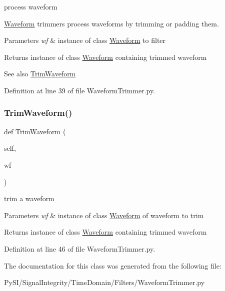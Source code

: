 process waveform 

\hyperlink{namespaceSignalIntegrity_1_1TimeDomain_1_1Waveform}{Waveform} trimmers process waveforms by trimming or padding them.


\begin{DoxyParams}{Parameters}
{\em wf} & instance of class \hyperlink{namespaceSignalIntegrity_1_1TimeDomain_1_1Waveform}{Waveform} to filter \\
\hline
\end{DoxyParams}
\begin{DoxyReturn}{Returns}
instance of class \hyperlink{namespaceSignalIntegrity_1_1TimeDomain_1_1Waveform}{Waveform} containing trimmed waveform 
\end{DoxyReturn}
\begin{DoxySeeAlso}{See also}
\hyperlink{classSignalIntegrity_1_1TimeDomain_1_1Filters_1_1WaveformTrimmer_1_1WaveformTrimmer_aba4602fa45a1eaabd2eb64f1866def53}{Trim\+Waveform} 
\end{DoxySeeAlso}


Definition at line 39 of file Waveform\+Trimmer.\+py.

\mbox{\label{classSignalIntegrity_1_1TimeDomain_1_1Filters_1_1WaveformTrimmer_1_1WaveformTrimmer_aba4602fa45a1eaabd2eb64f1866def53}} 
\subsubsection{\texorpdfstring{Trim\+Waveform()}{TrimWaveform()}}
{\footnotesize\ttfamily def Trim\+Waveform (\begin{DoxyParamCaption}\item[{}]{self,  }\item[{}]{wf }\end{DoxyParamCaption})}



trim a waveform 


\begin{DoxyParams}{Parameters}
{\em wf} & instance of class \hyperlink{namespaceSignalIntegrity_1_1TimeDomain_1_1Waveform}{Waveform} of waveform to trim \\
\hline
\end{DoxyParams}
\begin{DoxyReturn}{Returns}
instance of class \hyperlink{namespaceSignalIntegrity_1_1TimeDomain_1_1Waveform}{Waveform} containing trimmed waveform 
\end{DoxyReturn}


Definition at line 46 of file Waveform\+Trimmer.\+py.



The documentation for this class was generated from the following file\+:\begin{DoxyCompactItemize}
\item 
Py\+S\+I/\+Signal\+Integrity/\+Time\+Domain/\+Filters/Waveform\+Trimmer.\+py\end{DoxyCompactItemize}
